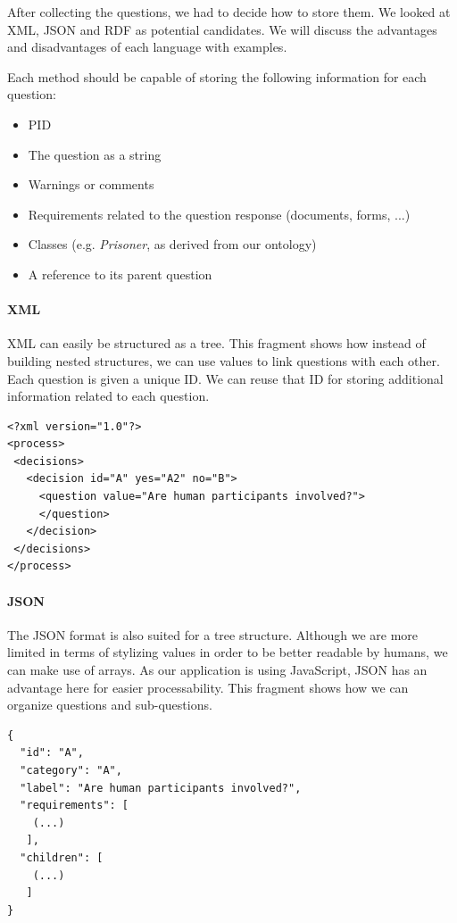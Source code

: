 \documentclass[10pt]{article}
\begin{document}
After collecting the questions, we had to decide how to store them. We looked at XML, JSON and RDF as potential candidates. We will discuss the advantages and disadvantages of each language with examples. 

Each method should be capable of storing the following information for each question:
\begin{itemize}
\item PID
\item The question as a string
\item Warnings or comments
\item Requirements related to the question response (documents, forms, ...)
\item Classes (e.g. \textit{Prisoner}, as derived from our ontology)
\item A reference to its parent question
\end{itemize}

\paragraph*{XML}
XML can easily be structured as a tree. This fragment shows how instead of building nested structures, we can use values to link questions with each other. Each question is given a unique ID. We can reuse that ID for storing additional information related to each question.

\noindent

\begin{minipage}{0.97\textwidth}
\begin{lstlisting}[frame=single]
<?xml version="1.0"?>
<process>
 <decisions>
   <decision id="A" yes="A2" no="B">
     <question value="Are human participants involved?">
     </question>
   </decision>
 </decisions>
</process>
\end{lstlisting}
\end{minipage}
\paragraph*{JSON} The JSON format is also suited for a tree structure. Although we are more limited in terms of stylizing values in order to be better readable by humans, we can make use of arrays. As our application is using JavaScript, JSON has an advantage here for easier processability. This fragment shows how we can organize questions and sub-questions.

\begin{lstlisting}[frame=single]
{
  "id": "A",
  "category": "A",
  "label": "Are human participants involved?",
  "requirements": [
    (...)
   ],
  "children": [
    (...)
   ]
}
\end{lstlisting}
\end{document}
